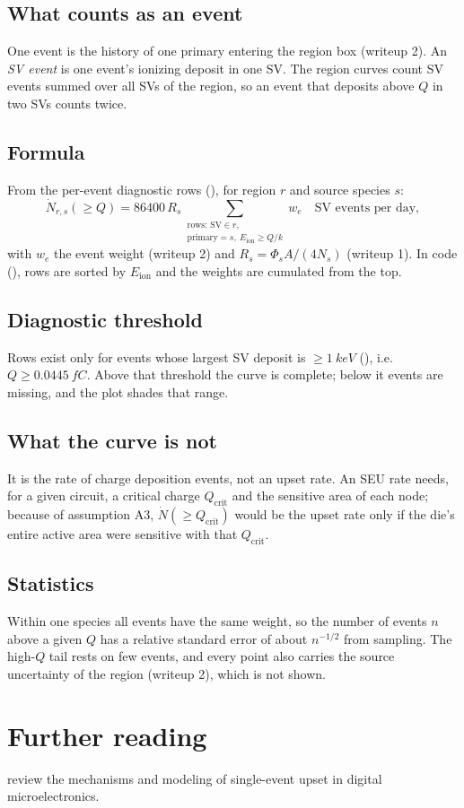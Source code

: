 \subsection{What counts as an event}
One \gfour{} event is the history of one primary entering the region box (writeup 2). An \emph{SV event} is one event's ionizing deposit in one SV. The region curves count SV events summed over all SVs of the region, so an event that deposits above $Q$ in two SVs counts twice.

\subsection{Formula}
From the per-event diagnostic rows (), for region $r$ and source species $s$:
\begin{equation}
  \dot N_{r,s}(\ge Q) = 86400\,R_s \sum_{\substack{\text{rows: SV}\in r,\\ \text{primary}=s,\ E_\text{ion}\ge Q/k}} w_e
  \quad\text{SV events per day},
\end{equation}
with $w_e$ the event weight (writeup 2) and $R_s = \Phi_sA/(4N_s)$ (writeup 1). In code (), rows are sorted by $E_\text{ion}$ and the weights are cumulated from the top.

\subsection{Diagnostic threshold}
Rows exist only for events whose largest SV deposit is $\ge\SI{1}{keV}$ (), i.e.\ $Q \ge \SI{0.0445}{fC}$. Above that threshold the curve is complete; below it events are missing, and the plot shades that range.

\subsection{What the curve is not}
It is the rate of charge deposition events, not an upset rate. An SEU rate needs, for a given circuit, a critical charge $Q_\text{crit}$ and the sensitive area of each node; because of assumption A3, $\dot N(\ge Q_\text{crit})$ would be the upset rate only if the die's entire active area were sensitive with that $Q_\text{crit}$.

\subsection{Statistics}
Within one species all events have the same weight, so the number of events $n$ above a given $Q$ has a relative standard error of about $n^{-1/2}$ from \gfour{} sampling. The high-$Q$ tail rests on few events, and every point also carries the \mcdc{} source uncertainty of the region (writeup 2), which is not shown.

\section{Further reading}
\citet{dodd2003basic} review the mechanisms and modeling of single-event upset in digital microelectronics.



